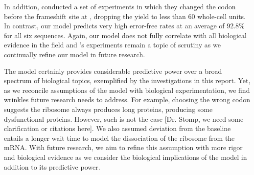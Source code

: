\documentclass[12pt]{article}
\numberwithin{equation}{section}
\begin{document}
In addition, \citet{weiss87} conducted a set of experiments in which
they changed the codon before the frameshift site at {},
dropping the yield to less than 60 whole-cell units. In contrast,
our model predicts very high error-free rates at an average of 92.8\%
for all six sequences. Again, our model does not fully correlate with
all biological evidence in the field and \citeauthor{weiss87}'s
experiments remain a topic of scrutiny as we continually refine our
model in future research.


The model certainly provides considerable predictive power over a broad spectrum
of biological topics, exemplified by the investigations in this report.  Yet,
as we reconcile assumptions of the model with biological
experimentation, we find wrinkles future research needs to address.
For example, choosing the wrong codon suggests the ribosome always produces
long proteins, producing some dysfunctional proteins. However, such is not the case
[Dr. Stomp, we need some clarification or citations here]. We also
assumed deviation from the baseline entails a longer wait time to
model the dissociation of the ribosome from the mRNA. With future
research, we aim to refine this assumption with more rigor and
biological evidence as we consider the biological implications of the model in addition
to its predictive power.

{}
\begin{singlespace}  \end{singlespace}
\end{document}
